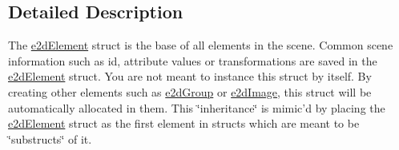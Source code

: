 \subsection{Detailed Description}
The \hyperlink{structe2dElement}{e2d\-Element} struct is the base of all elements in the scene. Common scene information such as id, attribute values or transformations are saved in the \hyperlink{structe2dElement}{e2d\-Element} struct. You are not meant to instance this struct by itself. By creating other elements such as \hyperlink{structe2dGroup}{e2d\-Group} or \hyperlink{structe2dImage}{e2d\-Image}, this struct will be automatically allocated in them. This \char`\"{}inheritance\char`\"{} is mimic'd by placing the \hyperlink{structe2dElement}{e2d\-Element} struct as the first element in structs which are meant to be \char`\"{}substructs\char`\"{} of it. 

